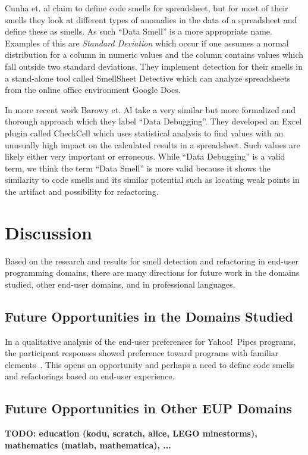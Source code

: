 \documentclass[10pt,conference,compsocconf]{IEEEtran}
\newcommand{\todo}[1]{\textbf{TODO: #1}}
\begin{document}
Cunha et. al \cite{cunha2012towards} claim to define code smells for spreadsheet, but for most of their smells they look at different types of anomalies in the data of a spreadsheet and define these as smells.
As such ``Data Smell'' is a more appropriate name.
Examples of this are \textit{Standard Deviation} which occur if one assumes a normal distribution for a column in numeric values and the column contains values which fall outside two standard deviations.
They implement detection for their smells in a stand-alone tool called SmellSheet Detective which can analyze spreadsheets from the online office environment Google Docs.

In more recent work Barowy et. Al \cite{barowy2014checkcell} take a very similar but more formalized and thorough approach which they label ``Data Debugging''.
They developed an Excel plugin called CheckCell which uses statistical analysis to find values with an unusually high impact on the calculated results in a spreadsheet.
Such values are likely either very important or erroneous.
While ``Data Debugging'' is a valid term, we think the term ``Data Smell'' is more valid because it shows the similarity to code smells and its similar potential such as locating weak points in the artifact and possibility for refactoring.

\section{Discussion}
\label{sec:discussion}

Based on the research and results for smell detection and refactoring in end-user programming domains, there are many directions for future work in the domains studied, other end-user domains, and in professional languages. 






\subsection{Future Opportunities in the Domains Studied}
In a qualitative analysis of the end-user preferences for Yahoo!\ Pipes programs, the participant responses showed preference toward programs with familiar elements~\cite{Stolee2015}. This opens an opportunity and perhaps a need to define code smells and refactorings based on end-user experience. 

\subsection{Future Opportunities in Other EUP Domains}
\todo{education (kodu, scratch, alice, LEGO minestorms), mathematics (matlab, mathematica), ...}
\end{document}

